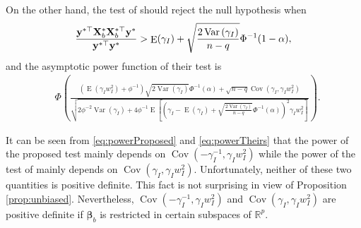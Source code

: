 \documentclass[11pt]{article}
\DeclareMathOperator{\myE}{E}
\DeclareMathOperator{\myVar}{Var}
\DeclareMathOperator{\myCov}{Cov}
\newcommand{\By}{\mathbf{y}}    \newcommand{\Bz}{\mathbf{z}}
\newcommand{\bfsym}[1]{\ensuremath{\boldsymbol{#1}}}
\def\bbeta{\bfsym \beta}
\theoremstyle{plain}
\theoremstyle{definition}
\theoremstyle{remark}
\begin{document}
On the other hand, the test of \cite{Goeman2006} should reject the null hypothesis when
\begin{equation*}
        \frac{
            \By^{*\top} \BX_b^* \BX_b^{*\top} \By^*
        }{
            \By^{*\top} \By^*
        } 
        >
        \myE (\gamma_I)
        +\sqrt{
            \frac{2\myVar\left( \gamma_I \right)}{n-q} 
        }
        \Phi^{-1}(1-\alpha),
\end{equation*}
and the asymptotic power function of their test is
\begin{equation}\label{eq:powerTheirs}
    \begin{split}
    &\Phi\left( 
        \frac{
            \left( \myE (\gamma_I w_I^2) + \phi^{-1} \right)
            \sqrt{2\myVar\left( \gamma_I \right)} 
            \Phi^{-1}(\alpha)
            +
            \sqrt{n-q}
            \myCov\left( \gamma_I, \gamma_I w_I^2 \right)
        }{
            \sqrt{
                2\phi^{-2} \myVar ( \gamma_I ) 
                +
                4\phi^{-1}
    \myE\left[ 
        \left( \gamma_I -\myE(\gamma_I) +\sqrt{\frac{2\myVar (\gamma_I)}{n-q}} \Phi^{-1}(\alpha) \right)^2
        \gamma_I w_I^2
    \right]
            }
        } 
    \right).
    \end{split}
\end{equation}

It can be seen from \eqref{eq:powerProposed} and \eqref{eq:powerTheirs} that the power of the proposed test mainly depends on $\myCov (-\gamma_I^{-1}, \gamma_I w_I^2)$ while the power of the test of \cite{Goeman2006} mainly depends on $\myCov(\gamma_I, \gamma_I w_I^2)$.  
Unfortunately, neither of these two quantities is positive definite.
This fact is not surprising in view of Proposition \ref{prop:unbiased}.
Nevertheless, $\myCov (-\gamma_I^{-1}, \gamma_I w_I^2)$ and $\myCov(\gamma_I, \gamma_I w_I^2)$ are positive definite if $\bbeta_b$ is restricted  in certain subspaces of $\mathbb R^p$.
\end{document}
